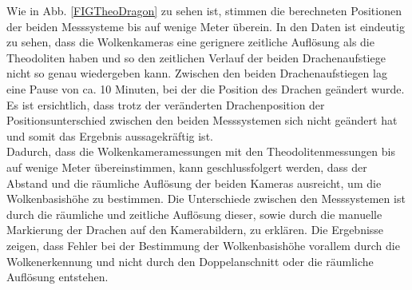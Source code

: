 \documentclass[a4paper,11pt,twoside,german]{article}
\begin{document}
Wie in Abb. \ref{FIGTheoDragon} zu sehen ist, stimmen die berechneten Positionen der beiden Messsysteme bis auf wenige Meter überein. In den Daten ist eindeutig zu sehen, dass die Wolkenkameras eine gerignere zeitliche Auflösung als die Theodoliten haben und so den zeitlichen Verlauf der beiden Drachenaufstiege nicht so genau wiedergeben kann. Zwischen den beiden Drachenaufstiegen lag eine Pause von ca. 10 Minuten, bei der die Position des Drachen geändert wurde. Es ist ersichtlich, dass trotz der veränderten Drachenposition der Positionsunterschied zwischen den beiden Messsystemen sich nicht geändert hat und somit das Ergebnis aussagekräftig ist.\\
Dadurch, dass die Wolkenkameramessungen mit den Theodolitenmessungen bis auf wenige Meter übereinstimmen, kann geschlussfolgert werden, dass der Abstand und die räumliche Auflösung der beiden Kameras ausreicht, um die Wolkenbasishöhe zu bestimmen. Die Unterschiede zwischen den Messsystemen ist durch die räumliche und zeitliche Auflösung dieser, sowie durch die manuelle Markierung der Drachen auf den Kamerabildern, zu erklären. Die Ergebnisse zeigen, dass Fehler bei der Bestimmung der Wolkenbasishöhe vorallem durch die Wolkenerkennung und nicht durch den Doppelanschnitt oder die räumliche Auflösung entstehen.
\end{document}
